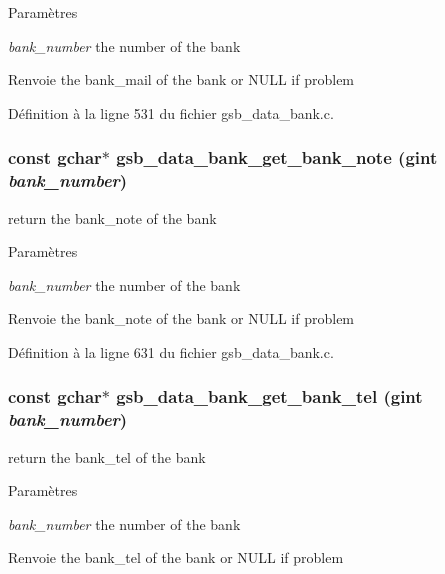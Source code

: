 \begin{DoxyParams}{Paramètres}
\item[{\em bank\_\-number}]the number of the bank\end{DoxyParams}
\begin{DoxyReturn}{Renvoie}
the bank\_\-mail of the bank or NULL if problem 
\end{DoxyReturn}


Définition à la ligne 531 du fichier gsb\_\-data\_\-bank.c.

\subsubsection[{gsb\_\-data\_\-bank\_\-get\_\-bank\_\-note}]{\setlength{\rightskip}{0pt plus 5cm}const gchar$\ast$ gsb\_\-data\_\-bank\_\-get\_\-bank\_\-note (gint {\em bank\_\-number})}\label{gsb__data__bank_8h_ada7393b44071e69a795f9609bc158f8e}
return the bank\_\-note of the bank


\begin{DoxyParams}{Paramètres}
\item[{\em bank\_\-number}]the number of the bank\end{DoxyParams}
\begin{DoxyReturn}{Renvoie}
the bank\_\-note of the bank or NULL if problem 
\end{DoxyReturn}


Définition à la ligne 631 du fichier gsb\_\-data\_\-bank.c.

\subsubsection[{gsb\_\-data\_\-bank\_\-get\_\-bank\_\-tel}]{\setlength{\rightskip}{0pt plus 5cm}const gchar$\ast$ gsb\_\-data\_\-bank\_\-get\_\-bank\_\-tel (gint {\em bank\_\-number})}\label{gsb__data__bank_8h_a22fcd40a34e1067278131a3605c4f99b}
return the bank\_\-tel of the bank


\begin{DoxyParams}{Paramètres}
\item[{\em bank\_\-number}]the number of the bank\end{DoxyParams}
\begin{DoxyReturn}{Renvoie}
the bank\_\-tel of the bank or NULL if problem 
\end{DoxyReturn}


